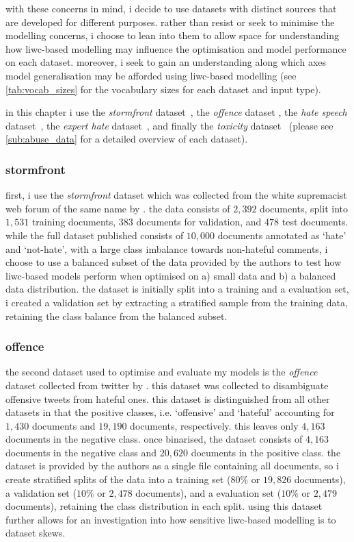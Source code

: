 with these concerns in mind, i decide to use datasets with distinct sources that are developed for different purposes.
rather than resist or seek to minimise the modelling concerns, i choose to lean into them to allow space for understanding how liwc-based modelling may influence the optimisation and model performance on each dataset.
moreover, i seek to gain an understanding along which axes model generalisation may be afforded using liwc-based modelling (see \cref{tab:vocab_sizes} for the vocabulary sizes for each dataset and input type).

in this chapter i use the \textit{stormfront} dataset~\citep{garcia:2019}, the \textit{offence} dataset \citep{davidson:2017}, the \textit{hate speech} dataset~\citep{waseem-hovy:2016}, the \textit{expert hate} dataset~\citep{waseem:2016}, and finally the \textit{toxicity} dataset~\citep{wulczyn:2017} (please see \cref{sub:abuse_data} for a detailed overview of each dataset).

\subsubsection{stormfront}
first, i use the \textit{stormfront} dataset which was collected from the white supremacist web forum of the same name by \citet{garcia:2019}.
the data consists of $2,392$ documents, split into $1,531$ training documents, $383$ documents for validation, and $478$ test documents.
while the full dataset published consists of $10,000$ documents annotated as `hate' and `not-hate', with a large class imbalance towards non-hateful comments, i choose to use a balanced subset of the data provided by the authors to test how liwc-based models perform when optimised on a) small data and b) a balanced data distribution.
the dataset is initially split into a training and a evaluation set, i created a validation set by extracting a stratified sample from the training data, retaining the class balance from the balanced subset.

\subsubsection{offence}
the second dataset used to optimise and evaluate my models is the \textit{offence} dataset collected from twitter by \citet{davidson:2017}.
this dataset was collected to disambiguate offensive tweets from hateful ones.
this dataset is distinguished from all other datasets in that the positive classes, i.e. `offensive' and `hateful' accounting for $1,430$ documents and $19,190$ documents, respectively.
this leaves only $4,163$ documents in the negative class. 
once binarised, the dataset consists of $4,163$ documents in the negative class and $20,620$ documents in the positive class.
the dataset is provided by the authors as a single file containing all documents, so i create stratified splits of the data into a training set ($80\%$ or $19,826$ documents), a validation set ($10\%$ or $2,478$ documents), and a evaluation set ($10\%$ or $2,479$ documents), retaining the class distribution in each split.
using this dataset further allows for an investigation into how sensitive liwc-based modelling is to dataset skews.

